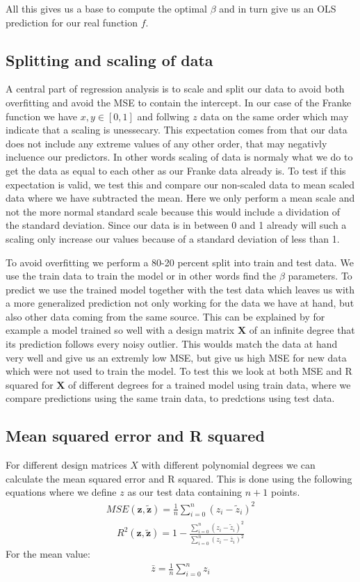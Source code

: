 \documentclass[12pt]{article}
\begin{document}
All this gives us a base to compute the optimal $\beta$ and in turn give us an OLS prediction for our real function $f$.

\subsection{Splitting and scaling of data}
A central part of regression analysis is to scale and split our data to avoid both overfitting and avoid the MSE to contain the intercept. In our case of the Franke function we have $x,y \in [0,1]$ and follwing $z$ data on the same order which may indicate that a scaling is unessecary. This expectation comes from that our data does not include any extreme values of any other order, that may negativly incluence our predictors. In other words scaling of data is normaly what we do to get the data as equal to each other as our Franke data already is. To test if this expectation is valid, we test this and compare our non-scaled data to mean scaled data where we have subtracted the mean. Here we only perform a mean scale and not the more normal standard scale because this would include a dividation of the standard deviation. Since our data is in between 0 and 1 already will such a scaling only increase our values because of a standard deviation of less than 1.

To avoid overfitting we perform a 80-20 percent split into train and test data. We use the train data to train the model or in other words find the $\beta$ parameters. To predict we use the trained model together with the test data which leaves us with a more generalized prediction not only working for the data we have at hand, but also other data coming from the same source. This can be explained by for example a model trained so well with a design matrix $\boldsymbol{X}$ of an infinite degree that its prediction follows every noisy outlier. This woulds match the data at hand very well and give us an extremly low MSE, but give us high MSE for new data which were not used to train the model. To test this we look at both MSE and R squared for $\boldsymbol{X}$ of different degrees for a trained model using train data, where we compare predictions using the same train data, to predctions using test data.
\subsection{Mean squared error and R squared}
For different design matrices $X$ with different polynomial degrees we can calculate the mean squared error and R squared. This is done using the following equations where we define $z$ as our test data containing $n+1$ points.
\begin{align*}
  MSE(\boldsymbol{z}, \boldsymbol{\tilde{z}}) = \frac{1}{n }\sum_{i=0}^{n}(z_i- \tilde{z}_i)^2
\end{align*}
\begin{align*}
  R^2(\boldsymbol{z}, \boldsymbol{\tilde{z}}) = 1 - \frac{\sum_{i=0}^{n}(z_i- \tilde{z}_i)^2}{\sum_{i=0}^{n}(z_i- \bar{z}_i)^2}
\end{align*}
For the mean value:
\begin{align*}
  \bar{z} = \frac{1}{n }\sum_{i=0}^{n}z_i
\end{align*}
\end{document}
